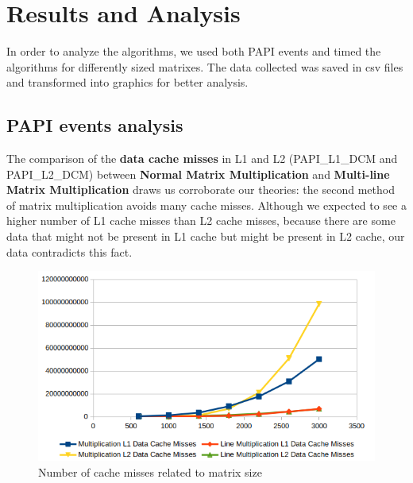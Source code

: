 \section{Results and Analysis}

In order to analyze the algorithms, we used both PAPI events and timed the algorithms for differently sized matrixes.
The data collected was saved in csv files and transformed into graphics for better analysis.

\subsection{PAPI events analysis}

The comparison of the \textbf{data cache misses} in L1 and L2 (PAPI\_L1\_DCM and PAPI\_L2\_DCM) between \textbf{Normal Matrix Multiplication} and \textbf{Multi-line Matrix Multiplication} draws us corroborate our theories: the second method of matrix multiplication avoids many cache misses. Although we expected to see a higher number of L1 cache misses than L2 cache misses, because there are some data that might not be present in L1 cache but might be present in L2 cache, our data contradicts this fact.

\begin{figure}[!h]
    \centering
    \includegraphics[width=.8\linewidth]{img/small_cache.png}
    \caption{Number of cache misses related to matrix size}
\end{figure}
